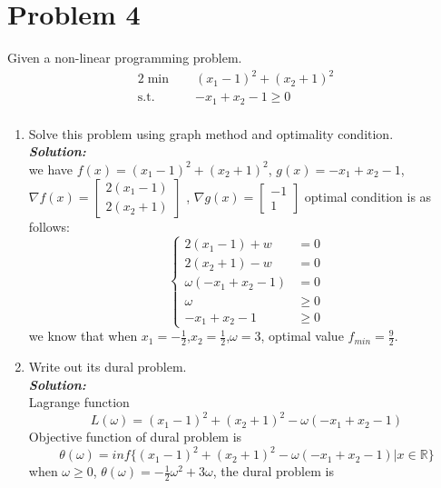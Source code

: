 \documentclass[paper=a4, fontsize=11pt]{scrartcl} %
\numberwithin{equation}{section} %
\numberwithin{figure}{section} %
\numberwithin{table}{section} %
\begin{document}
\section{Problem 4}
Given a non-linear programming problem.
\begin{alignat}{2}          \nonumber
\min\quad & (x_1-1)^2+(x_2+1)^2\\    \nonumber
\mbox{s.t.}\quad            \nonumber
& -x_1+x_2-1 \geq 0\\         \nonumber
\end{alignat}
\begin{enumerate}
\item   Solve this problem using graph method and optimality condition.
\\
\emph{\textbf{Solution:}}\\
we have $f(x)=(x_1-1)^2+(x_2+1)^2$, $g(x)=-x_1+x_2-1$,
$\nabla f(x)= \begin{bmatrix} 2(x_1-1) \\ 2(x_2+1)\end{bmatrix}$ , $\nabla g(x) = \begin{bmatrix}-1\\1\end{bmatrix}$
optimal condition is as follows:
\begin{equation} \nonumber
\left\{
\begin{aligned}
2(x_1-1)+w &= 0\\
2(x_2+1)-w &= 0\\
\omega(-x_1+x_2-1) &= 0\\
\omega &\geq 0\\
-x_1+x_2-1&\geq 0
\end{aligned}
\right.
\end{equation}
we know that when $x_1=-\frac{1}{2}$,$x_2=\frac{1}{2}$,$\omega=3$, optimal value $f_{min}=\frac{9}{2}$.
\item   Write out its dural problem.
\\
\emph{\textbf{Solution:}}\\
Lagrange function
\begin{equation} \nonumber
L(\omega) = (x_1-1)^2+(x_2+1)^2 - \omega(-x_1+x_2-1)
\end{equation}
Objective function of dural problem is
\begin{equation} \nonumber
\theta(\omega) = inf\{(x_1-1)^2+(x_2+1)^2 - \omega(-x_1+x_2-1) | x\in\mathbb{R}\}
\end{equation}
when $\omega\geq0$, $\theta(\omega)=-\frac{1}{2}\omega^2+3\omega$, the dural problem is

\end{enumerate}
\end{document}
